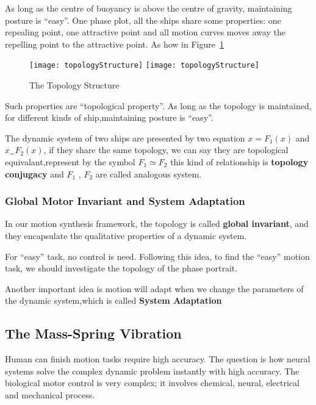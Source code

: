 As long as the centre of buoyancy is above the centre of gravity, maintaining posture is “easy”.
One phase plot, all the ships share some properties: one repealing point, one attractive point and all motion curves moves away the repelling point to the attractive point. As how in Figure~\ref{fig:topologyStructure}

\begin{figure}[!htbp]
  \begin{center}
    \leavevmode
    \ifpdf
      \texttt{[image: topologyStructure]}
    \else
      \texttt{[image: topologyStructure]}
    \fi
    \caption{The Topology Structure}
    \label{fig:topologyStructure}
  \end{center}
\end{figure}


Such properties are “topological property”.
As long as the topology is maintained, for different kinds of ship,maintaining posture is “easy”.

The dynamic system of two ships are presented by two equation $x=F_1(x)$ and $x_=F_2(x)$,
if they share the same topology, we can say they are topological equivalant,represent by the symbol $F_1 \simeq F_2$
this kind of relationship is \textbf{topology conjugacy}
and $F_1$ , $F_2$ are called analogous system.



\subsubsection*{Global Motor Invariant and System Adaptation}
In our motion synthesis framework, the topology is called \textbf{global invariant}, and they encapsulate the qualitative properties of a dynamic system.

For “easy” task, no control is need.
Following this idea, to find the “easy” motion task, we should investigate the topology of the phase portrait.

Another important idea is motion will adapt when we change the parameters of the dynamic system,which is called \textbf{System Adaptation}


\subsection{The Mass-Spring Vibration}
Human can finish motion tasks require high accuracy.
The question is how neural systems solve the complex dynamic problem instantly with high accuracy.
The biological motor control is very complex; it involves chemical, neural, electrical and mechanical process. 

